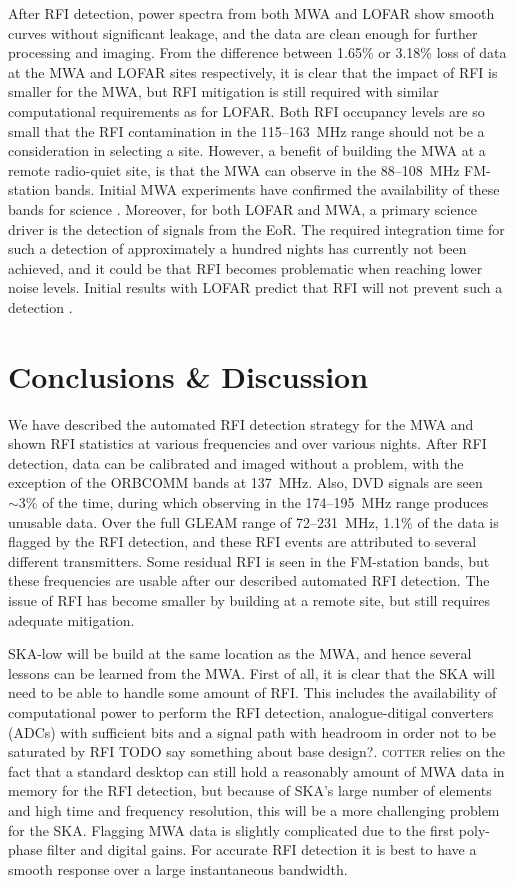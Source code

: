 \documentclass{pasa}
\begin{document}
After RFI detection, power spectra from both MWA and LOFAR show smooth curves without significant leakage, and the data are clean enough for further processing and imaging. From the difference between 1.65\% or 3.18\% loss of data at the MWA and LOFAR sites respectively, it is clear that the impact of RFI is smaller for the MWA, but RFI mitigation is still required with similar computational requirements as for LOFAR. Both RFI occupancy levels are so small that the RFI contamination in the 115--163~MHz range should not be a consideration in selecting a site. However, a benefit of building the MWA at a remote radio-quiet site, is that the MWA can observe in the 88--108~MHz FM-station bands. Initial MWA experiments have confirmed the availability of these bands for science \citep{mckinley-moon-2013,mwacs-2014}. Moreover, for both LOFAR and MWA, a primary science driver is the detection of signals from the EoR. The required integration time for such a detection of approximately a hundred nights has currently not been achieved, and it could be that RFI becomes problematic when reaching lower noise levels. Initial results with LOFAR predict that RFI will not prevent such a detection \citep{ncp-eor-yatawatta, offringa-rfi-distributions}.

\section{Conclusions \& Discussion}
We have described the automated RFI detection strategy for the MWA and shown RFI statistics at various frequencies and over various nights. After RFI detection, data can be calibrated and imaged without a problem, with the exception of the ORBCOMM bands at 137~MHz. Also, DVD signals are seen $\sim3\%$ of the time, during which observing in the 174--195~MHz range produces unusable data. Over the full GLEAM range of 72--231~MHz, 1.1\% of the data is flagged by the RFI detection, and these RFI events are attributed to several different transmitters. Some residual RFI is seen in the FM-station bands, but these frequencies are usable after our described automated RFI detection. The issue of RFI has become smaller by building at a remote site, but still requires adequate mitigation.

SKA-low will be build at the same location as the MWA, and hence several lessons can be learned from the MWA. First of all, it is clear that the SKA will need to be able to handle some amount of RFI. This includes the availability of computational power to perform the RFI detection, analogue-ditigal converters (ADCs) with sufficient bits and a signal path with headroom in order not to be saturated by RFI TODO say something about base design?. \textsc{cotter} relies on the fact that a standard desktop can still hold a reasonably amount of MWA data in memory for the RFI detection, but because of SKA's large number of elements and high time and frequency resolution, this will be a more challenging problem for the SKA. Flagging MWA data is slightly complicated due to the first poly-phase filter and digital gains. For accurate RFI detection it is best to have a smooth response over a large instantaneous bandwidth. 
\end{document}
